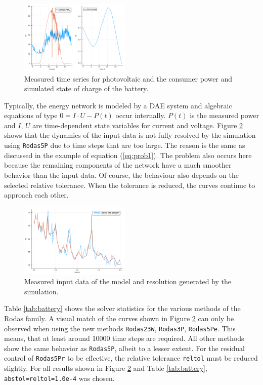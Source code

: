 \documentclass{juliacon}
\begin{document}
\begin{figure}
 \centering
 \includegraphics[width=0.47\textwidth]{Abb6a.pdf}
 \caption{Measured time series for photovoltaic and the consumer power and simulated state of charge of the battery.}\label{fig:energy}
\end{figure}

Typically, the energy network is modeled by a DAE system and algebraic equations of type $0 = I \cdot U - P(t)$ occur internally. $P(t)$ is the measured power and $I$, $U$ are time-dependent state 
variables for current and voltage.
Figure \ref{fig:energy1} shows that the dynamics of the input data is not fully resolved by the simulation using \verb|Rodas5P| due to time steps that are too large.
The reason is the same as discussed in the example of equation (\ref{eq:prob1}).
The problem also occurs here because the remaining components of the network have a much smoother behavior than the input data.
Of course, the behaviour also depends on the selected relative tolerance. When the tolerance is reduced, the curves continue to approach each other.

\begin{figure}
 \centering
 \includegraphics[width=0.47\textwidth]{Abb6b.pdf}
 \caption{Measured input data of the model and resolution generated by the simulation.}\label{fig:energy1}
\end{figure}

Table \ref{tab:battery} shows the solver statistics for the various methods of the Rodas family. A visual match of the curves shown in Figure \ref{fig:energy1} 
can only be observed when using the new methods \verb|Rodas23W|, \verb|Rodas3P|, \verb|Rodas5Pe|. 
This means, that at least around 10000 time steps are required.
All other methods show the same behavior as \verb|Rodas5P|, albeit to a lesser extent. For the residual control of \verb|Rodas5Pr| to be effective, 
the relative tolerance \verb|reltol| must be reduced slightly. For all results shown in Figure \ref{fig:energy1} and Table \ref{tab:battery}, \verb|abstol=reltol=1.0e-4| was chosen. 
\end{document}
